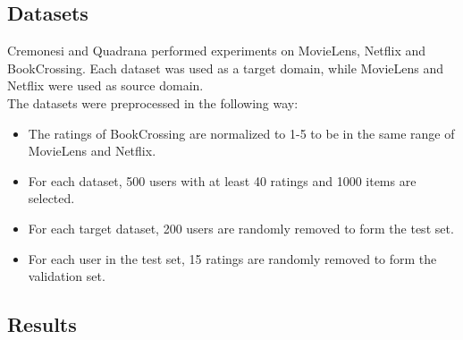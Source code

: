 \subsection{Datasets}

Cremonesi and Quadrana performed experiments on MovieLens, Netflix and BookCrossing. Each dataset was used as a target domain, while MovieLens and Netflix were used as source domain.\\
The datasets were preprocessed in the following way:
\begin{itemize}
\item The ratings of BookCrossing are normalized to 1-5 to be in the same range of MovieLens and Netflix.
\item For each dataset, 500 users with at least 40 ratings and 1000 items are selected.
\item For each target dataset, 200 users are randomly removed to form the test set.
\item For each user in the test set, 15 ratings are randomly removed to form the validation set.
\end{itemize}


\subsection{Results}

